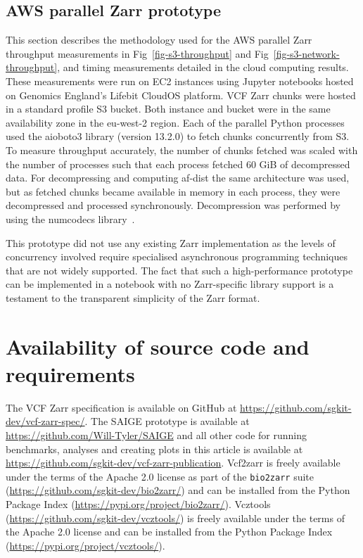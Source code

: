 \documentclass[a4paper,num-refs]{oup-contemporary}
\begin{document}
\subsection{AWS parallel Zarr prototype}
This section describes the methodology used for the AWS parallel Zarr
throughput measurements in Fig~\ref{fig-s3-throughput}
and Fig~\ref{fig-s3-network-throughput}, and timing measurements
detailed in the cloud computing results.
These measurements were run on EC2 instances using Jupyter notebooks
hosted on Genomics England's Lifebit CloudOS platform. VCF Zarr chunks
were hosted in a standard profile S3 bucket. Both instance and bucket were
in the same availability zone in the eu-west-2 region. Each
of the parallel Python processes used the aioboto3 library (version 13.2.0) to
fetch chunks concurrently from S3. To measure throughput accurately, the
number of chunks fetched was scaled with the number of processes such that
each process fetched 60 GiB of decompressed data.
For decompressing
and computing af-dist the same architecture was used, but as fetched chunks
became available in memory in each process, they were decompressed and
processed synchronously. Decompression was performed by using the 
numcodecs library~\citep{numcodecs}.

This prototype did not use any existing Zarr implementation as 
the levels of concurrency involved require specialised 
asynchronous programming techniques that are not widely supported.
The fact that such a high-performance prototype can be implemented
in a notebook with no Zarr-specific library support is a testament to the 
transparent simplicity of the Zarr format.

\section{Availability of source code and requirements}

The VCF Zarr specification is available on GitHub at
\url{https://github.com/sgkit-dev/vcf-zarr-spec/}.
The SAIGE prototype is available at \url{https://github.com/Will-Tyler/SAIGE}
and all other code for running benchmarks, analyses and creating
plots in this article is available at
\url{https://github.com/sgkit-dev/vcf-zarr-publication}.
Vcf2zarr is freely available under the terms of the Apache 2.0
license as part of the \texttt{bio2zarr}
suite (\url{https://github.com/sgkit-dev/bio2zarr/})
and can be installed from the Python Package Index
(\url{https://pypi.org/project/bio2zarr/}).
Vcztools (\url{https://github.com/sgkit-dev/vcztools/})
is freely available under the terms of the Apache 2.0
license and can be installed from the Python Package Index
(\url{https://pypi.org/project/vcztools/}).
\end{document}
